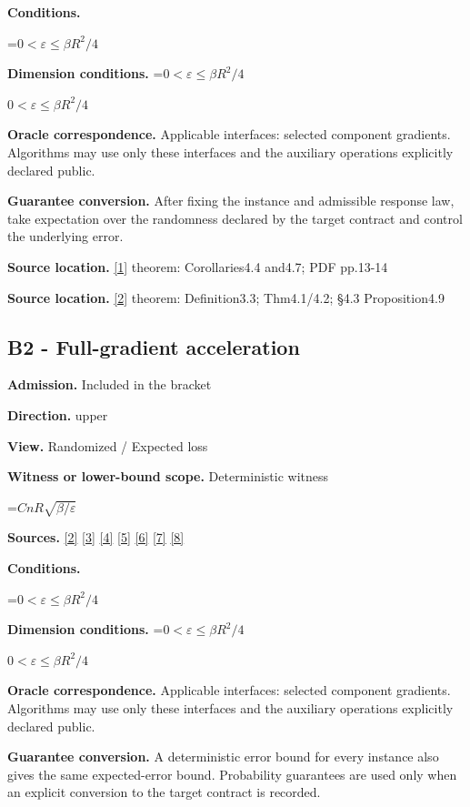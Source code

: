 \documentclass[10pt,a4paper]{article}
\newcommand{\AtlasMath}[1]{\par\begingroup\centering\setbox0=\hbox{$\displaystyle #1$}\ifdim\wd0>1.4\linewidth\typeout{ATLAS WIDE FORMULA: \the\wd0}\fi\ifdim\wd0>\linewidth\resizebox{\linewidth}{!}{\box0}\else\box0\fi\par\endgroup}
\newcommand{\AtlasInlineMath}[1]{\begingroup\setbox0=\hbox{$#1$}\ifdim\wd0>.4\linewidth\endgroup\AtlasMath{#1}\else\endgroup$#1$\fi}
\begin{document}
\textbf{Conditions.} 
\AtlasMath{0<\varepsilon\le\beta R^2/4}


\textbf{Dimension conditions.} \AtlasInlineMath{0<\varepsilon\le\beta R^2/4}

\textbf{Oracle correspondence.} Applicable interfaces: selected component gradients. Algorithms may use only these interfaces and the auxiliary operations explicitly declared public.

\textbf{Guarantee conversion.} After fixing the instance and admissible response law, take expectation over the randomness declared by the target contract and control the underlying error.

\textbf{Source location.} \href{https://arxiv.org/pdf/1802.03866}{[1]} theorem: Corollaries4.4 and4.7; PDF pp.13-14

\textbf{Source location.} \href{https://proceedings.mlr.press/v97/zhou19b/zhou19b.pdf}{[2]} theorem: Definition3.3; Thm4.1/4.2; §4.3 Proposition4.9

\subsection{B2 - Full-gradient acceleration}
\textbf{Admission.} Included in the bracket

\textbf{Direction.} upper

\textbf{View.} Randomized / Expected loss

\textbf{Witness or lower-bound scope.} Deterministic witness

\AtlasMath{CnR\sqrt{\beta/\varepsilon}}
\textbf{Sources.} \href{https://proceedings.mlr.press/v97/zhou19b/zhou19b.pdf}{[2]} \href{https://arxiv.org/pdf/1405.4980}{[3]} \href{https://arxiv.org/pdf/2101.09740v2}{[4]} \href{https://arxiv.org/pdf/2609.33360v2}{[5]} \href{https://arxiv.org/pdf/2609.10874}{[6]} \href{https://www2.isye.gatech.edu/~nemirovs/MOR_AccuracyCertificates.pdf}{[7]} \href{https://arxiv.org/pdf/2609.20701}{[8]}

\textbf{Conditions.} 
\AtlasMath{0<\varepsilon\le\beta R^2/4}


\textbf{Dimension conditions.} \AtlasInlineMath{0<\varepsilon\le\beta R^2/4}

\textbf{Oracle correspondence.} Applicable interfaces: selected component gradients. Algorithms may use only these interfaces and the auxiliary operations explicitly declared public.

\textbf{Guarantee conversion.} A deterministic error bound for every instance also gives the same expected-error bound. Probability guarantees are used only when an explicit conversion to the target contract is recorded.
\end{document}

